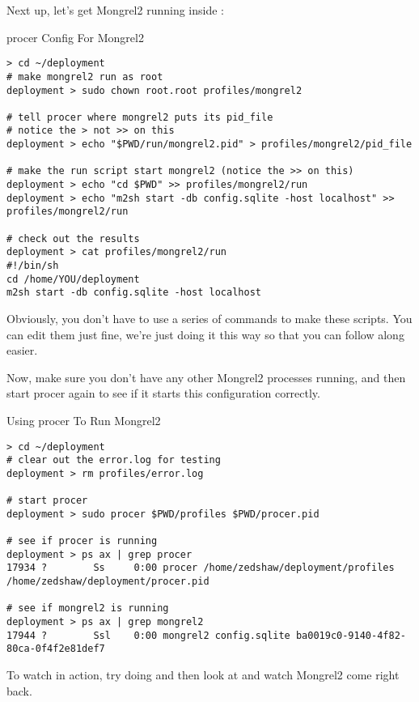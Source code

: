 Next up, let's get Mongrel2 running inside :

\begin{code}{procer Config For Mongrel2}
\begin{lstlisting}
> cd ~/deployment
# make mongrel2 run as root
deployment > sudo chown root.root profiles/mongrel2

# tell procer where mongrel2 puts its pid_file
# notice the > not >> on this
deployment > echo "$PWD/run/mongrel2.pid" > profiles/mongrel2/pid_file

# make the run script start mongrel2 (notice the >> on this)
deployment > echo "cd $PWD" >> profiles/mongrel2/run
deployment > echo "m2sh start -db config.sqlite -host localhost" >> profiles/mongrel2/run

# check out the results
deployment > cat profiles/mongrel2/run
#!/bin/sh
cd /home/YOU/deployment
m2sh start -db config.sqlite -host localhost
\end{lstlisting}
\end{code}

Obviously, you don't have to use a series of  commands to
make these scripts.  You can edit them just fine, we're just doing it
this way so that you can follow along easier.

Now, make sure you don't have any other Mongrel2 processes running,
and then start procer again to see if it starts this configuration
correctly.


\begin{code}{Using procer To Run Mongrel2}
\begin{lstlisting}
> cd ~/deployment
# clear out the error.log for testing
deployment > rm profiles/error.log

# start procer
deployment > sudo procer $PWD/profiles $PWD/procer.pid

# see if procer is running
deployment > ps ax | grep procer
17934 ?        Ss     0:00 procer /home/zedshaw/deployment/profiles /home/zedshaw/deployment/procer.pid

# see if mongrel2 is running
deployment > ps ax | grep mongrel2
17944 ?        Ssl    0:00 mongrel2 config.sqlite ba0019c0-9140-4f82-80ca-0f4f2e81def7

\end{lstlisting}
\end{code}

To watch  in action, try doing  and then look at  and watch
Mongrel2 come right back.


